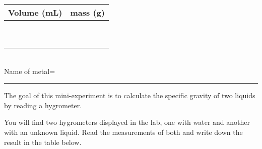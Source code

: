 \documentclass[main.tex]{subfiles}
\begin{document}
\begin{center}\begin{tabular}{ |p{3cm}|p{5cm}| }
\hline
    Volume (mL) &  mass (g)        \\
\hline
   \vspace{0cm}\vspace{.5cm} &           \\
\hline
   \vspace{0cm}\vspace{.5cm} &                 \\
\hline
   \vspace{0cm}\vspace{.5cm} &                 \\
\hline
   \vspace{0cm}\vspace{.5cm} &                 \\
\hline
   \vspace{0cm}\vspace{.5cm} &                 \\
\hline
  \vspace{0cm}\vspace{.5cm} &                 \\
\hline
  \vspace{0cm}\vspace{.5cm} &                 \\
\hline
  \vspace{0cm}\vspace{.5cm} &                 \\
\hline
  \vspace{0cm}\vspace{.5cm} &                 \\
\hline
\end{tabular}\end{center}





  \begin{center}
 \\
\vspace{0.2cm}
Name of metal=\rule{5cm}{0.4pt}
\end{center}


\vspace{0.2cm}{\large \bfseries 6. Reading a hygrometer }
The goal of this mini-experiment is to calculate the specific gravity of two liquids by reading a hygrometer.
\begin{steps}
        \newstep[]  You will find two hygrometers displayed in the lab, one with water and another with an unknown liquid.
        \newstep[] Read the measurements of both and write down the result in the table below.
      \end{steps}  
 
\end{document}
